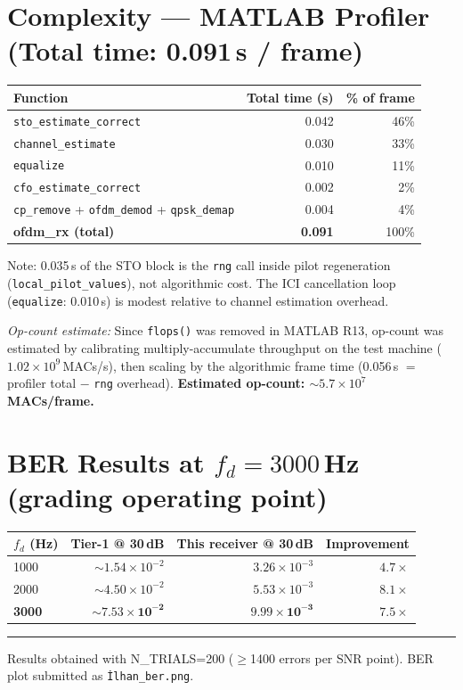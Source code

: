 \documentclass[10pt,a4paper]{article}
\begin{document}
\section{Complexity --- MATLAB Profiler (Total time: 0.091\,s / frame)}

\begin{center}
\small
\begin{tabular}{lrr}
\toprule
Function & Total time (s) & \% of frame \\
\midrule
\texttt{sto\_estimate\_correct} & 0.042 & 46\% \\
\texttt{channel\_estimate}      & 0.030 & 33\% \\
\texttt{equalize}               & 0.010 & 11\% \\
\texttt{cfo\_estimate\_correct} & 0.002 &  2\% \\
\texttt{cp\_remove} + \texttt{ofdm\_demod} + \texttt{qpsk\_demap} & 0.004 &  4\% \\
\midrule
\textbf{ofdm\_rx (total)}       & \textbf{0.091} & 100\% \\
\bottomrule
\end{tabular}
\end{center}

Note: 0.035\,s of the STO block is the \texttt{rng} call inside pilot regeneration
(\texttt{local\_pilot\_values}), not algorithmic cost.
The ICI cancellation loop (\texttt{equalize}: 0.010\,s) is modest relative to
channel estimation overhead.

\smallskip
{\small\textit{Op-count estimate:} Since \texttt{flops()} was removed in MATLAB R13,
op-count was estimated by calibrating multiply-accumulate throughput on the test machine
($1.02\times10^9$\,MACs/s), then scaling by the algorithmic frame time
(0.056\,s $=$ profiler total $-$ \texttt{rng} overhead).
\textbf{Estimated op-count: $\sim\!5.7\times10^7$ MACs/frame.}}

\section{BER Results at $f_d = 3000$\,Hz (grading operating point)}

\begin{center}
\small
\begin{tabular}{lrrr}
\toprule
$f_d$ (Hz) & Tier-1 @ 30\,dB & This receiver @ 30\,dB & Improvement \\
\midrule
1000 & $\sim1.54\times10^{-2}$ & $3.26\times10^{-3}$ & $4.7\times$ \\
2000 & $\sim4.50\times10^{-2}$ & $5.53\times10^{-3}$ & $8.1\times$ \\
\textbf{3000} & $\mathbf{\sim7.53\times10^{-2}}$ & $\mathbf{9.99\times10^{-3}}$ & $\mathbf{7.5\times}$ \\
\bottomrule
\end{tabular}
\end{center}

\vspace{2pt}\hrule\vspace{2pt}
{\footnotesize Results obtained with N\_TRIALS=200 ($\geq$1400 errors per SNR point).
BER plot submitted as \texttt{İlhan\_ber.png}.}
\end{document}
